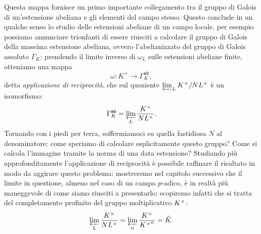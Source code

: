Questa mappa fornisce un primo importante collegamento tra il gruppo di Galois di un'estensione abeliana e gli elementi del campo stesso. Questo conclude in un qualche senso lo studio delle estensioni abeliane di un campo locale, per esempio possiamo annunciare trionfanti di essere riusciti a calcolare il gruppo di Galois della massima estensione abeliana, ovvero l'abelianizzato del gruppo di Galois assoluto $ \Gamma_K $: prendendo il limite inverso di $ \omega_L $ sulle estensioni abeliane finite, otteniamo una mappa
\[ \omega\colon K^\times \to \Gamma_K^{\texttt{ab}}, \]
detta \emph{applicazione di reciprocità}, che sul quoziente $ \varprojlim_L K^\times / NL^\times  $ è un isomorfismo:
\[ \Gamma_K^{\texttt{ab}} = \varprojlim_L \frac{K^\times}{NL^\times}. \]
Tornando con i piedi per terra, soffermiamoci su quella fastidiosa $ N $ al denominatore: come speriamo di calcolare esplicitamente questo gruppo? Come si calcola l'immagine tramite la norma di una data estensione? Studiando più approfonditamente l'applicazione di reciprocità è possibile raffinare il risultato in modo da aggirare questo problema: mostreremo nel capitolo successivo che il limite in questione, almeno nel caso di un campo $ p $-adico, è in realtà più maneggevole di come siamo riusciti a presentarlo; scopiremo infatti che si tratta del completamento profinito del gruppo moltiplicativo $ K^\times $:
\[ \varprojlim_L \frac{K^\times}{NL^\times} = \varprojlim_n \frac{K^\times}{{K^\times}^n} = \hat{K}. \]
